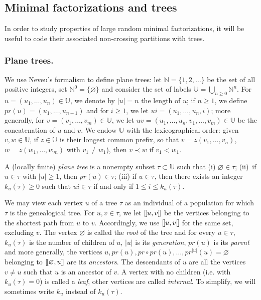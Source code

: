 \documentclass[AHL,XML,longabstracts,Unicode]{cedram}
\def\U{\mathbb{U}}
\def\N{\mathbb{N}}
\def\llbracket{[\hspace{-.10em} [ }
\def\rrbracket{ ] \hspace{-.10em}]}
\begin{document}
\subsection{Minimal factorizations and trees}
\label{sec:trees}

In order to study properties of large random minimal factorizations, it will be useful to code their associated non-crossing partitions with trees.

\subsubsection{Plane trees.} We use Neveu's formalism \cite{Nev86} to define plane trees: let $\N = \{1, 2, \dots\}$ be the set of all positive integers, set $\N^0 = \{\varnothing\}$ and consider the set of labels $\U = \bigcup_{n \ge 0} \N^n$. For $u = (u_1, \dots, u_n) \in \U$, we denote by $|u| = n$ the length of $u$; if $n \ge 1$, we define $pr(u) = (u_1, \dots, u_{n-1})$ and for $i \ge 1$, we let $ui = (u_1, \dots, u_n, i)$; more generally, for $v = (v_1, \dots, v_m) \in \U$, we let $uv = (u_1, \dots, u_n, v_1, \dots, v_m) \in \U$ be the concatenation of $u$ and $v$. We endow $\U$ with the lexicographical order: given $v,w \in \U$, if $z \in \U$ is their longest common prefix, so that $v = z(v_1, \dots, v_n)$, $w = z(w_1, \dots, w_m)$ with $v_1 \ne w_1$), then $v \prec w$ if $v_1 < w_1$.

A (locally finite) \emph{plane tree} is a nonempty  subset $\tau \subset \U$ such that (i) $\varnothing \in \tau$; (ii)~if $u \in \tau$ with $|u| \ge 1$, then $pr(u) \in \tau$; (iii)  if $u \in \tau$, then there exists an integer $k_u(\tau) \ge 0$ such that $ui \in \tau$ if and only if $1 \le i \le k_u(\tau)$.

We may view each vertex $u$ of a tree $\tau$ as an individual of a population for which $\tau$ is the genealogical tree. For $u,v \in \tau$, we let  $\llbracket u, v \rrbracket$ be the vertices belonging to the shortest path from $u$ to $v$.
Accordingly, we use $\llbracket u, v \llbracket$ for the same set, excluding $v$.
The vertex $\varnothing$ is called the \emph{root} of the tree and for every $u \in \tau$, $k_u(\tau)$ is the number of children of $u$, $|u|$ is its \emph{generation}, $pr(u)$ is its \emph{parent} and more generally, the vertices $u, pr(u), pr \circ pr (u), \dots, pr^{|u|}(u) = \varnothing$ belonging to $ \llbracket \varnothing, u \rrbracket$ are its \emph{ancestors}.
The descendants of $u$ are all the vertices $v \neq u$ such that $u$ is an ancestor of $v$.
A vertex with no children (i.e. with $k_u(\tau) = 0$)
is called a \emph{leaf}, other vertices are called \emph{internal}.
To simplify, we will sometimes write $k_{u}$ instead of $k_{u}(\tau)$.
\end{document}
